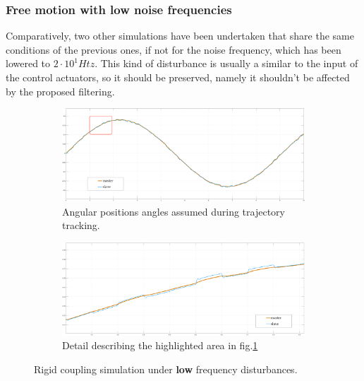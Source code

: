 \newpage
\subsubsection{Free motion with low noise frequencies}

Comparatively, two other simulations have been undertaken that share the same
conditions of the previous ones, if not for the noise frequency, which has been
lowered to $2\cdot 10^{1} Htz$.
\newline
This kind of disturbance is usually a similar to the input of the control
actuators, so it should be preserved, namely it shouldn't be affected by the
proposed filtering.

\begin{figure}[h]
	\begin{subfigure}[h!]{1\linewidth}
		\centering
		\includegraphics[width=\textwidth, height=0.48\textwidth]{Images/freerigidTot20HtznoiseRect}
		\caption{Angular positions angles assumed during trajectory tracking.}
		\label{fig:freeRigTot20HR}
	\end{subfigure}	
  \newline
	\begin{subfigure}[h!]{1\linewidth}
		\centering
		\includegraphics[width=\textwidth, height=0.48\textwidth]{Images/freerigidPart20Htznoise}
		\caption{Detail describing the highlighted area in fig.\ref{fig:freeRigTot20HR}}
		\label{fig:freeRigPar20HR}
	\end{subfigure}	
 \caption{ Rigid coupling simulation under \textbf{low} frequency disturbances.}
\end{figure}


